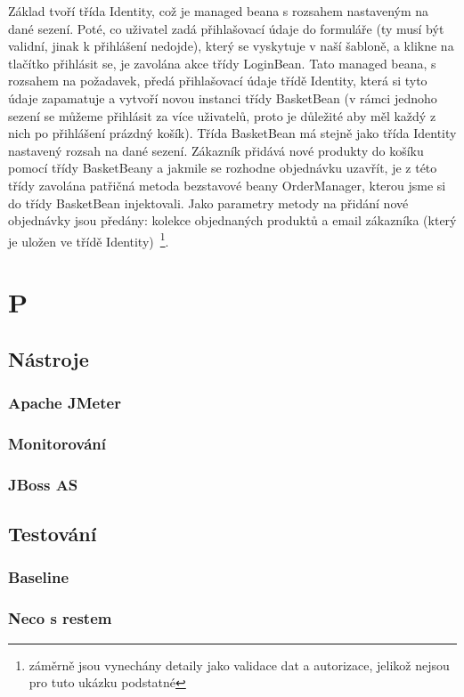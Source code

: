 \documentclass[122pt,oneside]{fithesis}
\begin{document}
Základ tvoří třída Identity, což je managed beana s rozsahem nastaveným na dané sezení. Poté, co uživatel zadá přihlašovací údaje do formuláře (ty musí být validní, jinak k přihlášení nedojde), který se vyskytuje v naší šabloně, a klikne na tlačítko přihlásit se, je zavolána akce třídy LoginBean. Tato managed beana, s rozsahem na požadavek, předá přihlašovací údaje třídě Identity, která si tyto údaje zapamatuje a vytvoří novou instanci třídy BasketBean (v rámci jednoho sezení se můžeme přihlásit za více uživatelů, proto je důležité aby měl každý z nich po přihlášení prázdný košík). Třída BasketBean má stejně jako třída Identity nastavený rozsah na dané sezení. Zákazník přidává nové produkty do košíku pomocí třídy BasketBeany a jakmile se rozhodne objednávku uzavřít, je z této třídy zavolána patřičná metoda bezstavové beany OrderManager, kterou jsme si do třídy BasketBean injektovali. Jako parametry metody na přidání nové objednávky jsou předány: kolekce objednaných produktů a email zákazníka (který je uložen ve třídě Identity)~\footnote{záměrně jsou vynechány detaily jako validace dat a autorizace, jelikož nejsou pro tuto ukázku podstatné}.

\chapter{P}
\section{Nástroje}
\subsection{Apache JMeter}
\subsection{Monitorování}
\subsection{JBoss AS}
\section{Testování}
\subsection{Baseline}
\subsection{Neco s restem}
\end{document}
